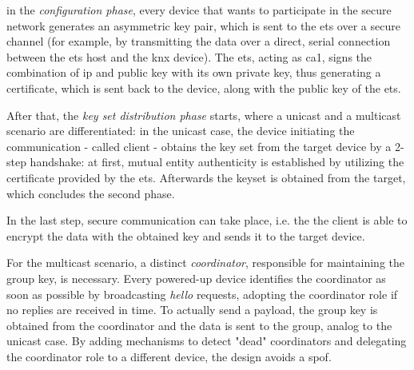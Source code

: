in the \textit{configuration phase}, every device that wants to participate in the secure network
generates an asymmetric key pair, which is sent to the \gls{ets} over a secure channel (for example, by transmitting the data over a direct, serial connection
between the \gls{ets} host and the \gls{knx} device).
The \gls{ets}, acting as \gls{ca1}, signs the combination of \gls{ip} and public key with its own private key, thus generating a certificate, which is sent back to the device, along
with the public key of the \gls{ets}. 

After that, the \textit{key set distribution phase} starts, where a unicast and a multicast scenario are differentiated:
in the unicast case, the device initiating the communication - called client - obtains the key set from the target device by a 2-step handshake: at first, mutual entity 
authenticity is established by utilizing the certificate provided by the \gls{ets}. Afterwards the keyset is obtained from the target, which concludes the second
phase.

In the last step, secure communication can take place, i.e. the the client is able to
encrypt the data with the obtained key and sends it to the target device.

For the multicast scenario, a distinct \textit{coordinator}, responsible for maintaining the group key, is necessary. Every powered-up device
identifies the coordinator as soon as possible by broadcasting \textit{hello} requests, adopting the coordinator role if no replies are received in time.
To actually send a payload, the group key is obtained from the coordinator and the data is sent to the group, analog to the unicast case.
By adding mechanisms to detect "dead" coordinators and delegating the coordinator role to a different device, the design avoids a \gls{spof}.

